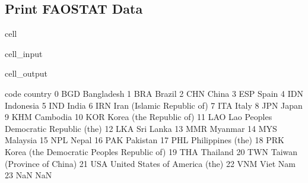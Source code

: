 \documentclass[letterpaper,10pt,english]{jupyterBook}
\begin{document}
\subsection{Print FAOSTAT Data}
\label{\detokenize{notebooks/data_exploration:print-faostat-data}}
\begin{sphinxuseclass}{cell}\begin{sphinxVerbatimInput}

\begin{sphinxuseclass}{cell_input}
\begin{sphinxVerbatim}[commandchars=\\\{\}]
\end{sphinxVerbatim}

\end{sphinxuseclass}\end{sphinxVerbatimInput}
\begin{sphinxVerbatimOutput}

\begin{sphinxuseclass}{cell_output}
\begin{sphinxVerbatim}[commandchars=\\\{\}]
   code                                      country  \PYGZbs{}
0   BGD                                   Bangladesh   
1   BRA                                       Brazil   
2   CHN                                        China   
3   ESP                                        Spain   
4   IDN                                    Indonesia   
5   IND                                        India   
6   IRN                   Iran (Islamic Republic of)   
7   ITA                                        Italy   
8   JPN                                        Japan   
9   KHM                                     Cambodia   
10  KOR                      Korea (the Republic of)   
11  LAO       Lao People\PYGZsq{}s Democratic Republic (the)   
12  LKA                                    Sri Lanka   
13  MMR                                      Myanmar   
14  MYS                                     Malaysia   
15  NPL                                        Nepal   
16  PAK                                     Pakistan   
17  PHL                            Philippines (the)   
18  PRK  Korea (the Democratic People\PYGZsq{}s Republic of)   
19  THA                                     Thailand   
20  TWN                   Taiwan (Province of China)   
21  USA               United States of America (the)   
22  VNM                                     Viet Nam   
23  NaN                                          NaN   


\end{sphinxVerbatim}
\end{sphinxuseclass}
\end{sphinxVerbatimOutput}
\end{sphinxuseclass}
\end{document}
